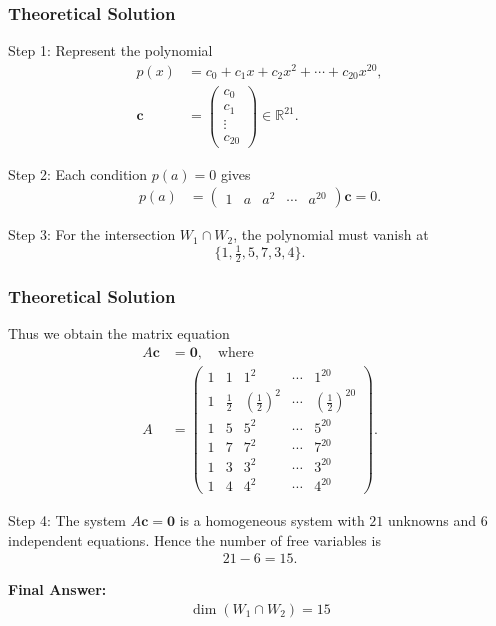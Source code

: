 \documentclass{beamer}
\theoremstyle{remark}
\newcommand{\myvec}[1]{\ensuremath{\begin{pmatrix}#1\end{pmatrix}}}
\let\vec\mathbf
\numberwithin{equation}{section}
\begin{document}
\begin{frame}
\frametitle{Theoretical Solution}
\noindent
Step 1: Represent the polynomial
\begin{align}
p(x) &= c_0 + c_1x + c_2x^2 + \cdots + c_{20}x^{20}, \\
\vec{c} &= \myvec{c_0 \\ c_1 \\ \vdots \\ c_{20}} \in \mathbb{R}^{21}.
\end{align}

\noindent
Step 2: Each condition $p(a)=0$ gives
\begin{align}
p(a) &= \myvec{1 & a & a^2 & \cdots & a^{20}} \vec{c} = 0.
\end{align}

\noindent
Step 3: For the intersection $W_1 \cap W_2$, the polynomial must vanish at 
\[
\{1,\tfrac12,5,7,3,4\}.
\]

\end{frame}

\begin{frame}
\frametitle{Theoretical Solution}
Thus we obtain the matrix equation
\begin{align}
A \vec{c} &= \vec{0}, \quad \text{where} \\
A &= \myvec{
1 & 1 & 1^2 & \cdots & 1^{20} \\
1 & \tfrac12 & (\tfrac12)^2 & \cdots & (\tfrac12)^{20} \\
1 & 5 & 5^2 & \cdots & 5^{20} \\
1 & 7 & 7^2 & \cdots & 7^{20} \\
1 & 3 & 3^2 & \cdots & 3^{20} \\
1 & 4 & 4^2 & \cdots & 4^{20}
}.
\end{align}

\noindent
Step 4: The system $A\vec{c}=\vec{0}$ is a homogeneous system with $21$ unknowns 
and $6$ independent equations. Hence the number of free variables is
\begin{align}
21 - 6 = 15.
\end{align}

\noindent
\textbf{Final Answer:}
\begin{align}
\dim(W_1 \cap W_2) = 15
\end{align}
\end{frame}
\end{document}
